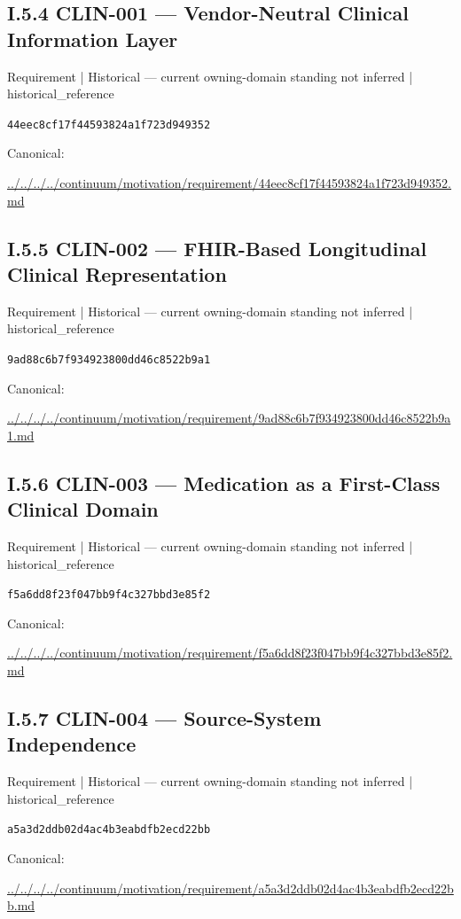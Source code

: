 \documentclass[10pt,a4paper]{article}
\begin{document}
\subsection*{I.5.4 CLIN-001 — Vendor-Neutral Clinical Information Layer}
\label{element-44eec8cf17f44593824a1f723d949352}
{\small Requirement | Historical — current owning-domain standing not inferred | historical\_reference}\par
\texttt{44eec8cf17f44593824a1f723d949352}\par
Canonical: \par
{\footnotesize\url{../../../../continuum/motivation/requirement/44eec8cf17f44593824a1f723d949352.md}}\par
\subsection*{I.5.5 CLIN-002 — FHIR-Based Longitudinal Clinical Representation}
\label{element-9ad88c6b7f934923800dd46c8522b9a1}
{\small Requirement | Historical — current owning-domain standing not inferred | historical\_reference}\par
\texttt{9ad88c6b7f934923800dd46c8522b9a1}\par
Canonical: \par
{\footnotesize\url{../../../../continuum/motivation/requirement/9ad88c6b7f934923800dd46c8522b9a1.md}}\par
\subsection*{I.5.6 CLIN-003 — Medication as a First-Class Clinical Domain}
\label{element-f5a6dd8f23f047bb9f4c327bbd3e85f2}
{\small Requirement | Historical — current owning-domain standing not inferred | historical\_reference}\par
\texttt{f5a6dd8f23f047bb9f4c327bbd3e85f2}\par
Canonical: \par
{\footnotesize\url{../../../../continuum/motivation/requirement/f5a6dd8f23f047bb9f4c327bbd3e85f2.md}}\par
\subsection*{I.5.7 CLIN-004 — Source-System Independence}
\label{element-a5a3d2ddb02d4ac4b3eabdfb2ecd22bb}
{\small Requirement | Historical — current owning-domain standing not inferred | historical\_reference}\par
\texttt{a5a3d2ddb02d4ac4b3eabdfb2ecd22bb}\par
Canonical: \par
{\footnotesize\url{../../../../continuum/motivation/requirement/a5a3d2ddb02d4ac4b3eabdfb2ecd22bb.md}}\par
\end{document}
